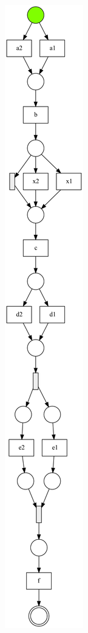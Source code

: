 \begin{figure}[htp]
	\centering
	\begin{subfigure}[b]{0.31\textwidth}
		\centering
		\includegraphics[width=0.75\linewidth, height=0.8\textheight]{figures/evaluation/PN-result-demo-s1-dfg.pdf}

\end{subfigure}
\end{figure}
